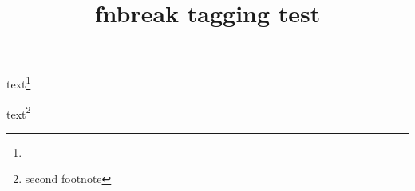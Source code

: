 \documentclass{article}
\title{fnbreak tagging test}
\begin{document}
\kant[1-3]
text\footnote{\kant[4-5]}

text\footnote{second footnote}
\end{document}
